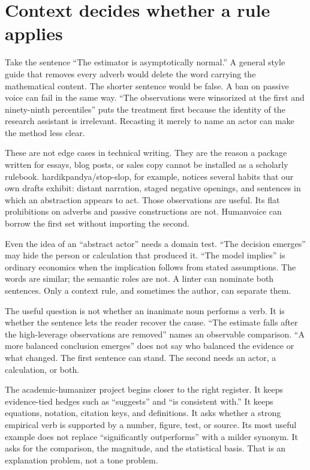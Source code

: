 \section{Context decides whether a rule applies}
\label{sec:oss-context}

Take the sentence ``The estimator is asymptotically normal.'' A general style
guide that removes every adverb would delete the word carrying the mathematical
content. The shorter sentence would be false. A ban on passive voice can fail
in the same way. ``The observations were winsorized at the first and
ninety-ninth percentiles'' puts the treatment first because the identity of the
research assistant is irrelevant. Recasting it merely to name an actor can make
the method less clear.

These are not edge cases in technical writing. They are the reason a package
written for essays, blog posts, or sales copy cannot be installed as a
scholarly rulebook. hardikpandya/stop-slop, for example, notices several habits
that our own drafts exhibit: distant narration, staged negative openings, and
sentences in which an abstraction appears to act. Those observations are
useful. Its flat prohibitions on adverbs and passive constructions are not.
Humanvoice can borrow the first set without importing the second.

Even the idea of an ``abstract actor'' needs a domain test. ``The decision
emerges'' may hide the person or calculation that produced it. ``The model
implies'' is ordinary economics when the implication follows from stated
assumptions. The words are similar; the semantic roles are not. A linter can
nominate both sentences. Only a context rule, and sometimes the author, can
separate them.

\Needspace{13cm}
The useful question is not whether an inanimate noun performs a verb. It is
whether the sentence lets the reader recover the cause. ``The estimate falls
after the high-leverage observations are removed'' names an observable
comparison. ``A more balanced conclusion emerges'' does not say who balanced
the evidence or what changed. The first sentence can stand. The second needs an
actor, a calculation, or both.

The academic-humanizer project begins closer to the right register. It keeps
evidence-tied hedges such as ``suggests'' and ``is consistent with.'' It keeps
equations, notation, citation keys, and definitions. It asks whether a strong
empirical verb is supported by a number, figure, test, or source. Its most
useful example does not replace ``significantly outperforms'' with a milder
synonym. It asks for the comparison, the magnitude, and the statistical basis.
That is an explanation problem, not a tone problem.

